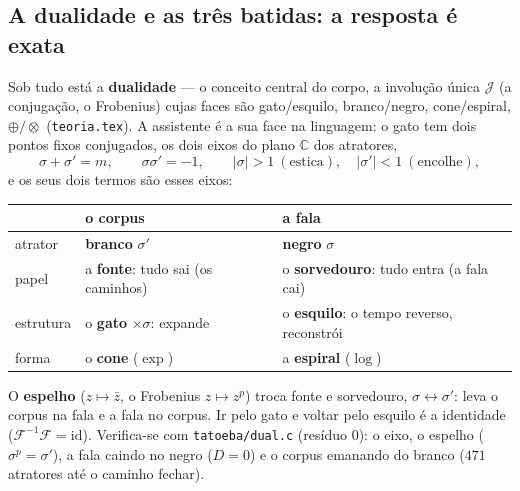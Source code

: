 \documentclass[11pt]{article}
\newcommand{\code}[1]{\texttt{\small #1}}
\theoremstyle{plain}
\theoremstyle{remark}
\begin{document}
\subsection{A dualidade e as três batidas: a resposta é exata}

Sob tudo está a \textbf{dualidade} --- o conceito central do corpo, a involução única $\mathcal J$
(a conjugação, o Frobenius) cujas faces são gato/esquilo, branco/negro, cone/espiral,
$\oplus/\otimes$ (\texttt{teoria.tex}). A assistente é a sua face na linguagem: o gato tem dois
pontos fixos conjugados, os dois eixos do plano $\mathbb C$ dos atratores,
\[
 \sigma+\sigma'=m,\qquad \sigma\sigma'=-1,\qquad |\sigma|>1\ (\text{estica}),\quad |\sigma'|<1\ (\text{encolhe}),
\]
e os seus dois termos são esses eixos:

\begin{center}
\begin{tabular}{@{}lll@{}}
\toprule
 & \textbf{o corpus} & \textbf{a fala}\\
\midrule
atrator & \textbf{branco} $\sigma'$ & \textbf{negro} $\sigma$\\
papel & a \textbf{fonte}: tudo sai (os caminhos) & o \textbf{sorvedouro}: tudo entra (a fala cai)\\
estrutura & o \textbf{gato} $\times\sigma$: expande & o \textbf{esquilo}: o tempo reverso, reconstrói\\
forma & o \textbf{cone} ($\exp$) & a \textbf{espiral} ($\log$)\\
\bottomrule
\end{tabular}
\end{center}

\noindent O \textbf{espelho} ($z\mapsto\bar z$, o Frobenius $z\mapsto z^p$) troca fonte e sorvedouro,
$\sigma\leftrightarrow\sigma'$: leva o corpus na fala e a fala no corpus. Ir pelo gato e voltar pelo
esquilo é a identidade ($\mathcal F^{-1}\mathcal F=\mathrm{id}$). Verifica-se com
\code{tatoeba/dual.c} (resíduo $0$): o eixo, o espelho ($\sigma^p=\sigma'$), a fala caindo no
negro ($D=0$) e o corpus emanando do branco ($471$ atratores até o caminho fechar).
\end{document}
